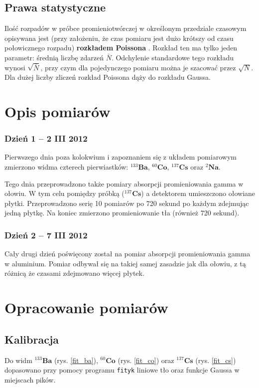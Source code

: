 \documentclass[10pt, twocolumn]{article}
\begin{document}
\subsection*{Prawa statystyczne}
Ilość rozpadów w próbce promieniotwórczej w określonym przedziale czasowym opisywana jest (przy założeniu, że czas pomiaru jest dużo krótszy od czasu połowicznego rozpadu) \textbf{rozkładem Poissona} \cite{agh}. Rozkład ten ma tylko jeden parametr: średnią liczbę zdarzeń $\bar{N}$. Odchylenie standardowe tego rozkładu wynosi $\sqrt{\bar{N}}$, przy czym dla pojedynczego pomiaru można je szacować przez $\sqrt{N}$. Dla dużej liczby zliczeń rozkład Poissona dąży do rozkładu Gaussa.

\section*{Opis pomiarów}
\subsubsection*{Dzień 1 -- 2 III 2012}
Pierwszego dnia poza kolokwium i zapoznaniem się z układem pomiarowym zmierzono widma czterech pierwiastków: $^{133}\mathbf{Ba}$, $^{60}\mathbf{Co}$,  $^{137}\mathbf{Cs}$ oraz $^{2}\mathbf{Na}$.

Tego dnia przeprowadzono także pomiary absorpcji promieniowania gamma w ołowiu. W tym celu pomiędzy próbką ($^{137}\mathbf{Cs}$) a detektorem umieszczono ołowiane płytki. Przeprowadzono serię 10 pomiarów po 720 sekund po każdym zdejmując jedną płytkę. Na koniec zmierzono promieniowanie tła (również 720 sekund).

\subsubsection*{Dzień 2 -- 7 III 2012}
Cały drugi dzień poświęcony został na pomiar absorpcji promieniowania gamma w aluminium. Pomiar odbywał się na takiej samej zasadzie jak dla ołowiu, z tą różnicą że czasami zdejmowano więcej płytek.



\section*{Opracowanie pomiarów}

\subsection*{Kalibracja}
Do widm $^{133}\mathbf{Ba}$ (rys. \ref{fit_ba}), $^{60}\mathbf{Co}$ (rys. \ref{fit_co}) oraz $^{137}\mathbf{Cs}$ (rys. \ref{fit_cs}) dopasowano przy pomocy programu \texttt{fityk} \cite{fityk} liniowe tło oraz funkcje Gaussa w miejscach pików.
\end{document}
